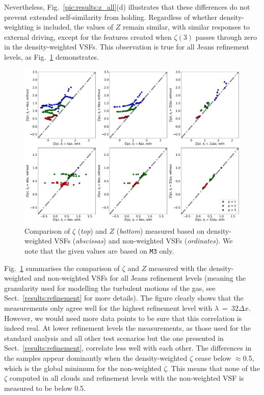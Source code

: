 Nevertheless, Fig.~\ref{pic:results:z_all}(d) illustrates that these differences do not prevent extended self-similarity from holding. 
Regardless of whether density-weighting is included, the values of $Z$ remain similar, with similar responses to external driving, except for the features created when $\zeta(3)$ passes through zero in the density-weighted VSFs.
This observation is true for all Jeans refinement levels, as Fig.~\ref{pic:results:comp_weighting} demonstrates.


\begin{figure}
	\centering
    \includegraphics[width=\textwidth]{comp_weighting.pdf}
    \caption{ Comparison of $\zeta$ (\textit{top}) and $Z$ (\textit{bottom}) measured based on density-weighted VSFs (\textit{abscissas}) and non-weighted VSFs (\textit{ordinates}). We note that the given values are based on \texttt{M3} only.}
    \label{pic:results:comp_weighting}
\end{figure}

Fig.~\ref{pic:results:comp_weighting} summarises the comparison of $\zeta$ and $Z$ measured with the density-weighted and non-weighted VSFs for all Jeans refinement levels (meaning the granularity used for modelling the turbulent motions of the gas, see Sect.~\ref{results:refinement} for more details).
The figure clearly shows that the measurements only agree well for the highest refinement level with $\lambda~=~32\Delta x$.
However, we would need more data points to be sure that this correlation is indeed real.
At lower refinement levels the measurements, as those used for the standard analysis and all other test scenarios but the one presented in Sect.~\ref{results:refinement}, correlate less well with each other. 
The differences in the samples appear dominantly when the density-weighted $\zeta$ cease below $\approx$0.5, which is the global minimum for the non-weighted $\zeta$. 
This means that none of the $\zeta$ computed in all clouds and refinement levels with the non-weighted VSF is measured to be below 0.5.

